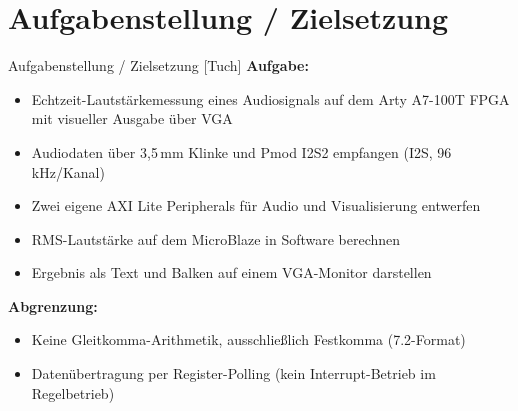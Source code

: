 \section{Aufgabenstellung / Zielsetzung}
\begin{frame}{Aufgabenstellung / Zielsetzung [Tuch]}
    \textbf{Aufgabe:}
    \begin{itemize}
        \item Echtzeit-Lautstärkemessung eines Audiosignals auf dem Arty A7-100T FPGA mit visueller Ausgabe über VGA
        \item Audiodaten über 3{,}5\,mm Klinke und Pmod I2S2 empfangen (I2S, 96\,kHz/Kanal)
        \item Zwei eigene AXI Lite Peripherals für Audio und Visualisierung entwerfen
        \item RMS-Lautstärke auf dem MicroBlaze in Software berechnen
        \item Ergebnis als Text und Balken auf einem VGA-Monitor darstellen
    \end{itemize}
    \vspace{0.4em}
    \textbf{Abgrenzung:}
    \begin{itemize}
        \item Keine Gleitkomma-Arithmetik, ausschließlich Festkomma (7.2-Format)
        \item Datenübertragung per Register-Polling (kein Interrupt-Betrieb im Regelbetrieb)
    \end{itemize}
\end{frame}
